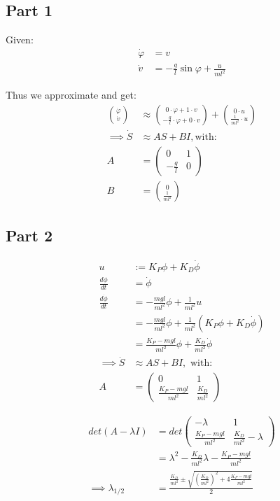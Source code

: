 \documentclass[a4paper,parskip,headheight=38pt]{scrartcl} %
\begin{document}
\subsection*{Part 1}

Given:
\begin{align*}
    \dot{\varphi} &= v \\
    \dot{v} &= - \frac{g}{l} \sin \varphi + \frac{u}{ml^2}
\end{align*}

Thus we approximate and get:
\begin{align*}
    \binom{\dot{\varphi}}{\dot{v}} &\approx \binom{0 \cdot \varphi + 1 \cdot v}{- \frac{g}{l} \cdot \varphi + 0 \cdot v} + \binom{0 \cdot u}{\frac{1}{ml^2} \cdot u} \\
    \implies \dot{S} &\approx AS + BI, \text{with:} \\
    A &= \left( \begin{array}{cc} 0 & 1 \\ -\frac{g}{l} & 0 \end{array} \right) \\
    B &= \binom{0}{\frac{1}{ml^2}}
\end{align*}

\subsection*{Part 2}
\begin{align*}
	u &:= K_P \phi + K_D \dot{\phi} \\
	\frac{d \phi}{d t} &= \dot{\phi} \\
	\frac{d \dot{\phi}}{d t} &= - \frac{mgl}{ml^2} \phi + \frac{1}{ml^2}u \\
	&= - \frac{mgl}{ml^2} \phi + \frac{1}{ml^2} (K_P \phi + K_D \dot{\phi}) \\
	&= \frac{K_P-mgl}{ml^2}\phi + \frac{K_D}{ml^2}\dot{\phi} \\
	\implies \dot{S} &\approx AS + BI, \text{ with:} \\
    A &= \left( \begin{array}{cc} 0 & 1 \\ \frac{K_P-mgl}{ml^2} & \frac{K_D}{ml^2} \end{array} \right)
\end{align*}

\begin{align*}
det(A - \lambda I) &=  det\left( \begin{array}{cc} -\lambda & 1 \\ \frac{K_P-mgl}{ml^2} & \frac{K_D}{ml^2} - \lambda \end{array} \right) \\
 &= \lambda ^ 2 - \frac{K_D}{ml^2}\lambda - \frac{K_P - mgl}{ml^2} \\
\implies \lambda_{1/2} &= \frac{\frac{K_D}{ml^2} \pm \sqrt{\left(\frac{K_D}{ml^2}\right)^2 + 4\frac{K_P - mgl}{ml^2}}}{2}
\end{align*}
\end{document}
